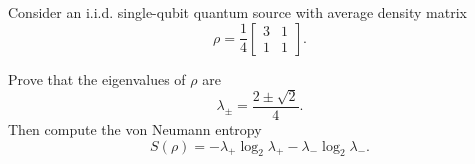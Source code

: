 Consider an i.i.d. single-qubit quantum source with average density matrix
$$
\rho
=
\frac{1}{4}
\begin{bmatrix}
3 & 1\\
1 & 1
\end{bmatrix}.
$$

Prove that the eigenvalues of $\rho$ are
$$
\lambda_{\pm}
=
\frac{2\pm \sqrt{2}}{4}.
$$
Then compute the von Neumann entropy
$$
S(\rho)
=
-\lambda_+\log_2\lambda_+
-\lambda_-\log_2\lambda_-.
$$
